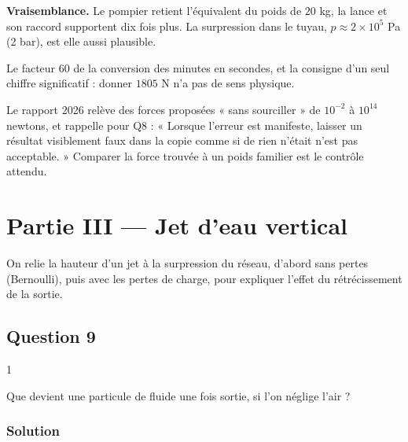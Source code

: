 \documentclass[11pt,a4paper]{article}
\newcommand{\equationajustee}[1]{%
  \sbox{\boiteequation}{$\displaystyle #1$}%
  \ifdim\wd\boiteequation>\linewidth
    \[\resizebox{\linewidth}{!}{\usebox{\boiteequation}}\]%
  \else
    \[#1\]%
  \fi}
\begin{document}
\equationajustee{\boxed{F\approx2\times10^2\ \mathrm N}}

\textbf{Vraisemblance.} Le pompier retient l'équivalent du poids de \(20\) kg, la lance et son raccord supportent dix fois plus. La surpression dans le tuyau, \(p\approx2\times10^5\) Pa (2 bar), est elle aussi plausible.

\begin{piege}

Le facteur 60 de la conversion des minutes en secondes, et la consigne d'un seul chiffre significatif : donner \(1805\) N n'a pas de sens physique.

\end{piege}

\begin{jury}

Le rapport 2026 relève des forces proposées « sans sourciller » de \(10^{-2}\) à \(10^{14}\) newtons, et rappelle pour Q8 : « Lorsque l'erreur est manifeste, laisser un résultat visiblement faux dans la copie comme si de rien n'était n'est pas acceptable. » Comparer la force trouvée à un poids familier est le contrôle attendu.

\end{jury}

\hypertarget{partie-iii-jet-deau-vertical}{%
\section{Partie III --- Jet d'eau vertical}\label{partie-iii-jet-deau-vertical}}

On relie la hauteur d'un jet à la surpression du réseau, d'abord sans pertes (Bernoulli), puis avec les pertes de charge, pour expliquer l'effet du rétrécissement de la sortie.

\hypertarget{question-9}{%
\subsection{Question 9}\label{question-9}}

\begin{indication}{1}

Que devient une particule de fluide une fois sortie, si l'on néglige l'air ?

\end{indication}

\hypertarget{solution-8}{%
\subsubsection{Solution}\label{solution-8}}
\end{document}
